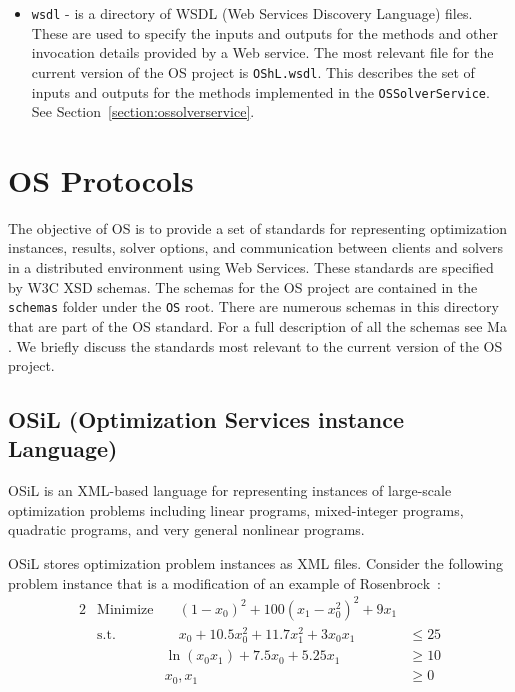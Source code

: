 \documentclass[11pt]{article}
\renewcommand{\_}{{\char"5F}}
\renewcommand{\{}{{\char"7B}}
\renewcommand{\}}{{\char"7D}}
\renewcommand{\^}{{\char"0D}}
\renewcommand{\'}{{\char"0D}}
\begin{document}
\begin{enumerate}[Step 1:]
\begin{itemize}
\item  {\tt wsdl} - is a directory of WSDL (Web Services Discovery Language) files. These are used to specify 
the inputs and outputs for the methods and other invocation details provided by a Web service. The most relevant 
file for the current version of the OS project is {\tt OShL.wsdl}.
This describes the set of inputs and outputs for the methods implemented in the {\tt OSSolverService}. 
See Section~\ref{section:ossolverservice}.

\end{itemize}


\section{OS Protocols}\label{section:schemadescriptions}

The objective of OS is to provide a set of standards for representing optimization instances, results, solver options, 
and communication between clients and solvers in a distributed environment using Web Services.  These standards are 
specified by W3C XSD schemas. The schemas for the OS project are contained in the {\tt schemas} folder under the 
{\tt OS} root. There are numerous schemas in this directory that are part of the OS standard. 
For a full description of all the schemas see  Ma \cite{junma2005}.  We briefly discuss the standards most relevant 
to the current version of the OS project.


\subsection{OSiL (Optimization Services instance Language)} \label{section:osilschema}
OSiL is
an XML-based language for representing instances of large-scale
optimization problems including linear programs, mixed-integer programs,
quadratic programs, and very general nonlinear programs.

  OSiL  stores optimization problem instances as
XML files.  Consider the following problem instance that is a
modification of an example of Rosenbrock~\cite{rosenbrock1960}:
%
\begin{alignat}{2}
& \mbox{Minimize} & \quad (1 - x_{0})^{2} + 100(x_{1} - x_{0}^{2})^{2} + 9x_{1} \label{eq:roobj}\\
& \mbox{s.t.} & \quad x_{0} + 10.5 x_{0}^{2} + 11.7 x_{1}^{2} + 3x_{0}x_{1}  &\le 25  \label{eq:ro1}\\
& & \ln(x_{0} x_{1}) + 7.5 x_{0} + 5.25 x_{1} &\ge 10 \label{eq:ro2}\\
& & x_{0}, x_{1} &\ge 0 \label{eq:ro3}
\end{alignat}



\end{enumerate}
\end{document}
